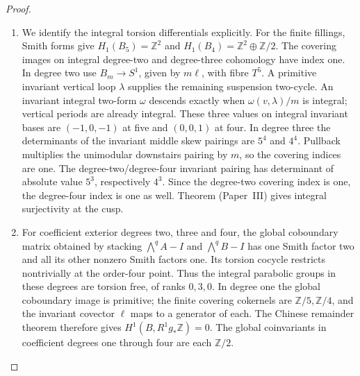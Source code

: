 \documentclass[11pt,a4paper]{article}
\theoremstyle{definition}
\newcommand{\ExternalPaperRef}[3]{\ifmmode\text{\upshape #1#2 (Paper~#3)}\else #1#2 (Paper~#3)\fi}
\begin{document}
\begin{proof}
\begin{enumerate}[label=\arabic*.]
\item We identify the integral torsion differentials explicitly.
For the finite fillings, Smith forms give
$H_1(B_5)=\mathbb Z^2$ and
$H_1(B_4)=\mathbb Z^2\oplus\mathbb Z/2$.
The covering images on integral degree-two and degree-three
cohomology have index one.  In degree two use
$B_m\to S^1$, given by $m\ell$, with fibre $T^5$.
A primitive invariant vertical loop $\lambda$ supplies the
remaining suspension two-cycle.  An invariant integral
two-form $\omega$ descends exactly when
$\omega(v,\lambda)/m$ is integral; vertical periods are
already integral.  These three values on integral invariant
bases are $(-1,0,-1)$ at five and $(0,0,1)$ at four.
In degree three the determinants of the invariant middle
skew pairings are $5^4$ and $4^4$.  Pullback multiplies the
unimodular downstairs pairing by $m$, so the covering indices
are one.  The degree-two/degree-four invariant pairing has
determinant of absolute value $5^3$, respectively $4^3$.
Since the degree-two covering index is one, the degree-four
index is one as well.  Theorem \ExternalPaperRef{}{6.3}{III} gives integral
surjectivity at the cusp.

\item For coefficient exterior degrees two, three and four, the
global coboundary matrix obtained by stacking
$\bigwedge^qA-I$ and $\bigwedge^qB-I$ has one Smith factor
two and all its other nonzero Smith factors one.
Its torsion cocycle restricts nontrivially at the order-four
point.  Thus the integral parabolic groups in these degrees
are torsion free, of ranks $0,3,0$.  In degree one the global
coboundary image is primitive; the finite covering cokernels
are $\mathbb Z/5,\mathbb Z/4$, and the invariant covector
$\ell$ maps to a generator of each.  The Chinese remainder
theorem therefore gives $H^1(B,R^1g_*\mathbb Z)=0$.
The global coinvariants in coefficient degrees one through
four are each $\mathbb Z/2$.


\end{enumerate}
\end{proof}
\end{document}

